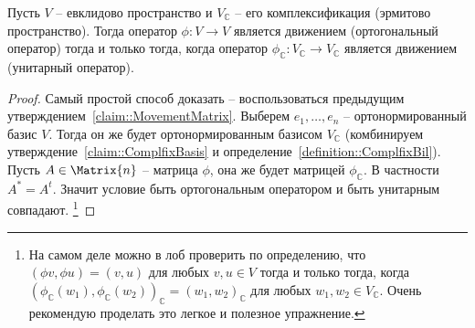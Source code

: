 \begin{claim}
\label{claim::MovementComplfix}
Пусть $V$ -- евклидово пространство и $V_\mathbb C$ -- его комплексификация (эрмитово пространство).
Тогда оператор $\phi \colon V\to V$ является движением (ортогональный оператор) тогда и только тогда, когда оператор $\phi_\mathbb C\colon V_\mathbb C\to V_\mathbb C$ является движением (унитарный оператор).
\end{claim}
\begin{proof}
Самый простой способ доказать -- воспользоваться предыдущим утверждением~\ref{claim::MovementMatrix}.
Выберем $e_1,\ldots,e_n$ -- ортонормированный базис $V$.
Тогда он же будет ортонормированным базисом $V_\mathbb C$ (комбинируем утверждение~\ref{claim::ComplfixBasis} и определение~\ref{definition::ComplfixBil}).
Пусть $A\in\Matrix{n}$ -- матрица $\phi$, она же будет матрицей $\phi_\mathbb C$.
В частности $A^* = A^t$.
Значит условие быть ортогональным оператором и быть унитарным совпадают.%
\footnote{На самом деле можно в лоб проверить по определению, что $(\phi v, \phi u) = (v, u)$ для любых $v,u\in V$ тогда и только тогда, когда $(\phi_\mathbb C(w_1), \phi_\mathbb C(w_2))_\mathbb C = (w_1,w_2)_\mathbb C$ для любых $w_1,w_2\in V_\mathbb C$.
Очень рекомендую проделать это легкое и полезное упражнение.}
\end{proof}


